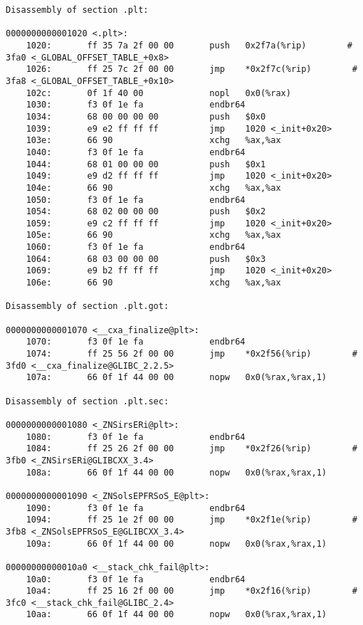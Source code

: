 \documentclass[UTF8,a4paper,10pt]{ctexart}
\begin{document}
\begin{lstlisting}[title=链接前后汇编代码对比,frame=trbl]
Disassembly of section .plt:

0000000000001020 <.plt>:
    1020:       ff 35 7a 2f 00 00       push   0x2f7a(%rip)        # 3fa0 <_GLOBAL_OFFSET_TABLE_+0x8>
    1026:       ff 25 7c 2f 00 00       jmp    *0x2f7c(%rip)        # 3fa8 <_GLOBAL_OFFSET_TABLE_+0x10>
    102c:       0f 1f 40 00             nopl   0x0(%rax)
    1030:       f3 0f 1e fa             endbr64
    1034:       68 00 00 00 00          push   $0x0
    1039:       e9 e2 ff ff ff          jmp    1020 <_init+0x20>
    103e:       66 90                   xchg   %ax,%ax
    1040:       f3 0f 1e fa             endbr64
    1044:       68 01 00 00 00          push   $0x1
    1049:       e9 d2 ff ff ff          jmp    1020 <_init+0x20>
    104e:       66 90                   xchg   %ax,%ax
    1050:       f3 0f 1e fa             endbr64
    1054:       68 02 00 00 00          push   $0x2
    1059:       e9 c2 ff ff ff          jmp    1020 <_init+0x20>
    105e:       66 90                   xchg   %ax,%ax
    1060:       f3 0f 1e fa             endbr64
    1064:       68 03 00 00 00          push   $0x3
    1069:       e9 b2 ff ff ff          jmp    1020 <_init+0x20>
    106e:       66 90                   xchg   %ax,%ax

Disassembly of section .plt.got:

0000000000001070 <__cxa_finalize@plt>:
    1070:       f3 0f 1e fa             endbr64
    1074:       ff 25 56 2f 00 00       jmp    *0x2f56(%rip)        # 3fd0 <__cxa_finalize@GLIBC_2.2.5>
    107a:       66 0f 1f 44 00 00       nopw   0x0(%rax,%rax,1)

Disassembly of section .plt.sec:

0000000000001080 <_ZNSirsERi@plt>:
    1080:       f3 0f 1e fa             endbr64
    1084:       ff 25 26 2f 00 00       jmp    *0x2f26(%rip)        # 3fb0 <_ZNSirsERi@GLIBCXX_3.4>
    108a:       66 0f 1f 44 00 00       nopw   0x0(%rax,%rax,1)

0000000000001090 <_ZNSolsEPFRSoS_E@plt>:
    1090:       f3 0f 1e fa             endbr64
    1094:       ff 25 1e 2f 00 00       jmp    *0x2f1e(%rip)        # 3fb8 <_ZNSolsEPFRSoS_E@GLIBCXX_3.4>
    109a:       66 0f 1f 44 00 00       nopw   0x0(%rax,%rax,1)

00000000000010a0 <__stack_chk_fail@plt>:
    10a0:       f3 0f 1e fa             endbr64
    10a4:       ff 25 16 2f 00 00       jmp    *0x2f16(%rip)        # 3fc0 <__stack_chk_fail@GLIBC_2.4>
    10aa:       66 0f 1f 44 00 00       nopw   0x0(%rax,%rax,1)


\end{lstlisting}
\end{document}

